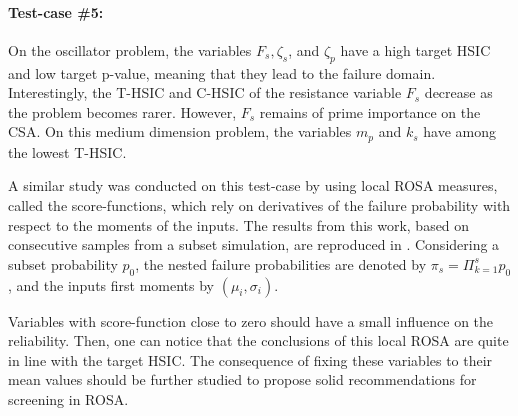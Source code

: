 \paragraph{Test-case \#5:}
On the oscillator problem, the variables $F_s, \zeta_s$, and $\zeta_p$ have a high target HSIC and low target p-value, meaning that they lead to the failure domain.    
Interestingly, the T-HSIC and C-HSIC of the resistance variable $F_s$ decrease as the problem becomes rarer. 
However, $F_s$ remains of prime importance on the CSA. 
On this medium dimension problem, the variables $m_p$ and $k_s$ have among the lowest T-HSIC. 

A similar study was conducted on this test-case by \citet{bourinet_2018} using local ROSA measures, called the score-functions, which rely on derivatives of the failure probability with respect to the moments of the inputs. 
The results from this work, based on consecutive samples from a subset simulation, are reproduced in . 
Considering a subset probability $p_0$, the nested failure probabilities are denoted by $\pi_s = \Pi_{k=1}^s p_0$, and the inputs first moments by $(\mu_i, \sigma_i)$. 

Variables with score-function close to zero should have a small influence on the reliability. 
Then, one can notice that the conclusions of this local ROSA are quite in line with the target HSIC. 
The consequence of fixing these variables to their mean values should be further studied to propose solid recommendations for screening in ROSA.


